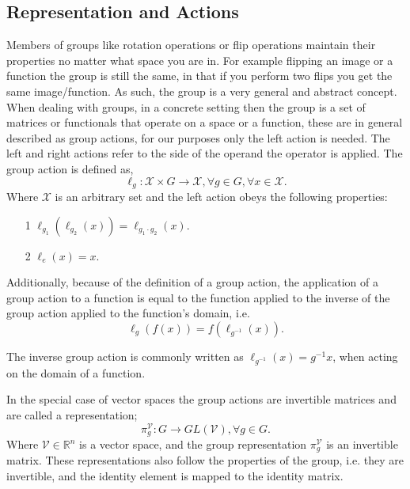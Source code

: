 \subsection{Representation and Actions}
Members of groups like rotation operations or flip operations maintain their properties no matter what space you are in. For example flipping an image or a function the group is still the same, in that if you perform two flips you get the same image/function. As such, the group is a very general and abstract concept. When dealing with groups, in a concrete setting then the group is a set of matrices or functionals that operate on a space or a function, these are in general described as group actions, for our purposes only the left action is needed. The left and right actions refer to the side of the operand the operator is applied. The group action is defined as,
\begin{equation}
	\ell_g: \mathcal{X} \times G \rightarrow \mathcal{X}, \forall g \in G, \forall x \in \mathcal{X}.
\end{equation}
Where $\mathcal{X}$ is an arbitrary set and the left action obeys the following properties:
\begin{itemize}
	\item[1] $\ell_{g_1}(\ell_{g_2}(x)) = \ell_{g_1 \cdot g_2}(x)$.
	\item[2] $\ell_e(x) = x$.
\end{itemize}
Additionally, because of the definition of a group action, the application of a group action to a function is equal to the function applied to the inverse of the group action applied to the function's domain, i.e.
\begin{equation}
	\ell_g(f(x)) = f(\ell_{g^{-1}}(x)).
\end{equation}

The inverse group action is commonly written as $\ell_{g^{-1}}(x) = g^{-1}x$, when acting on the domain of a function.

In the special case of vector spaces the group actions are invertible matrices and are called a representation;
\begin{equation}
	\pi_g^\mathcal{V}: G \rightarrow GL(\mathcal{V}), \forall g \in G.
\end{equation}
Where $\mathcal{V} \in \mathbb{R}^n$ is a vector space, and the group representation $\pi_g^\mathcal{V}$ is an invertible matrix. These representations also follow the properties of the group, i.e. they are invertible, and the identity element is mapped to the identity matrix.
